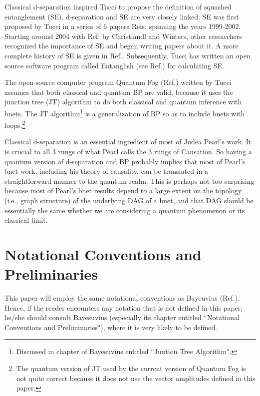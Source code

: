 \documentclass[12pt]{article}
\begin{document}
Classical d-separation inspired
Tucci to propose the definition
of squashed entanglement (SE).
d-separation and SE
are very closely linked. 
SE
was first proposed  by Tucci
in a series of 6 papers 
Refs.\cite{ent1, ent2, ent3, ent4, ent5, ent6}
spanning the years 1999-2002.
Starting around 2004 with
Ref.\cite{putrid-squash} by Christiandl and Winters,
other researchers 
recognized the importance of SE
and began writing papers about it.
A more complete history of SE
is given in Ref.\cite{wiki-sq-ent}.
Subsequently, Tucci has written an open source software
program 
called Entanglish (see Ref.\cite{entanglish}) for 
calculating SE.

The open-source computer program
 Quantum Fog (Ref.\cite{qfog})
written by Tucci assumes
that
both classical and quantum BP
 are valid, because
it uses the 
junction tree (JT) algorithm  
to do both classical
and quantum inference with bnets.
The JT
algorithm\footnote{Discussed 
in chapter of Bayesuvius entitled 
``Juntion Tree Algorithm".}
is a generalization of BP so as to 
include bnets with loops.\footnote{
The quantum version of JT used by the current version of
Quantum Fog is not quite correct
because it does not use the vector amplitudes defined
in this paper.}

Classical d-separation
is 
an essential ingredient of most of Judea Pearl's 
work. It 
is crucial
to all 3 rungs of 
what Pearl calls the 3 rungs
of Causation.
So having a quantum version
of d-separation
and BP
probably 
implies
that most of Pearl's
bnet
work, 
including
his theory of
causality, 
can be translated
in a straightforward 
manner to
the quantum realm.
This
is perhaps not too surprising
because most
of Pearl's bnet 
results depend to
a large extent
on the topology (i.e., graph
structure) of the underlying
DAG of a bnet, and that DAG 
should be essentially
the same whether we are
considering a quantum
phenomenon or
its classical limit.






\section{Notational Conventions
 and Preliminaries}
This paper
will employ the same
notational
conventions as
Bayeuvius (Ref.\cite{bayesuvius}).
Hence, if
the reader encounters
any notation that
is not defined
in this paper,
he/she should consult Bayesuvius (especially
its chapter
entitled ``Notational Conventions and Preliminaries"),
where it is very likely
to be defined.
\end{document}
